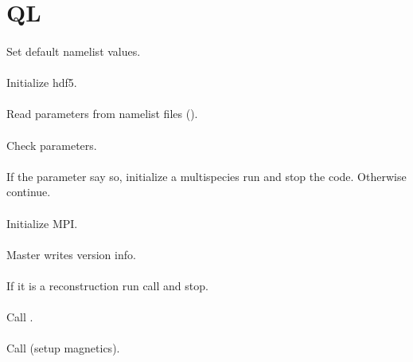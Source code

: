 \section{QL}

\paragraph{}
Set default namelist values.

\paragraph{}
Initialize hdf5.

\paragraph{}
Read parameters from namelist files ().

\paragraph{}
Check parameters.

\paragraph{}
If the parameter say so, initialize a multispecies run and stop the
code.
Otherwise continue.

\paragraph{}
Initialize MPI.

\paragraph{}
Master writes version info.

\paragraph{}
If it is a reconstruction run call 
and stop.

\paragraph{}
Call .

\paragraph{}
Call  (setup magnetics).

